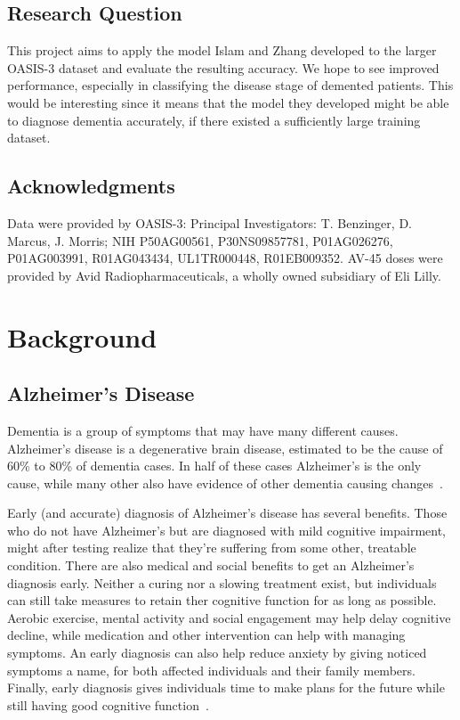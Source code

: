 \documentclass{kththesis}
\begin{document}
\section{Research Question}
This project aims to apply the model Islam and Zhang developed to the larger OASIS-3 dataset \parencite{oasis3} and evaluate the resulting accuracy. We hope to see improved performance, especially in classifying the disease stage of demented patients. This would be interesting since it means that the model they developed might be able to diagnose dementia accurately, if there existed a sufficiently large training dataset.

\section{Acknowledgments}
Data were provided by OASIS-3: Principal Investigators: T. Benzinger, D. Marcus, J. Morris; NIH P50AG00561, P30NS09857781, P01AG026276, P01AG003991, R01AG043434, UL1TR000448, R01EB009352. AV-45 doses were provided by Avid Radiopharmaceuticals, a wholly owned subsidiary of Eli Lilly.

\chapter{Background}

\section{Alzheimer's Disease}

Dementia is a group of symptoms that may have many different causes. Alzheimer's disease is a degenerative brain disease, estimated to be the cause of 60\% to 80\% of dementia cases. In half of these cases Alzheimer's is the only cause, while many other also have evidence of other dementia causing changes~\cite{factsfigures2018}.

Early (and accurate) diagnosis of Alzheimer's disease has several benefits. Those who do not have Alzheimer's but are diagnosed with mild cognitive impairment, might after testing realize that they're suffering from some other, treatable condition. There are also medical and social benefits to get an Alzheimer's diagnosis early. Neither a curing nor a slowing treatment exist, but individuals can still take measures to retain ther cognitive function for as long as possible. Aerobic exercise, mental activity and social engagement may help delay cognitive decline, while medication and other intervention can help with managing symptoms. An early diagnosis can also help reduce anxiety by giving noticed symptoms a name, for both affected individuals and their family members. Finally, early diagnosis gives individuals time to make plans for the future while still having good cognitive function~\cite[p. 406-409]{factsfigures2018}.
\end{document}
